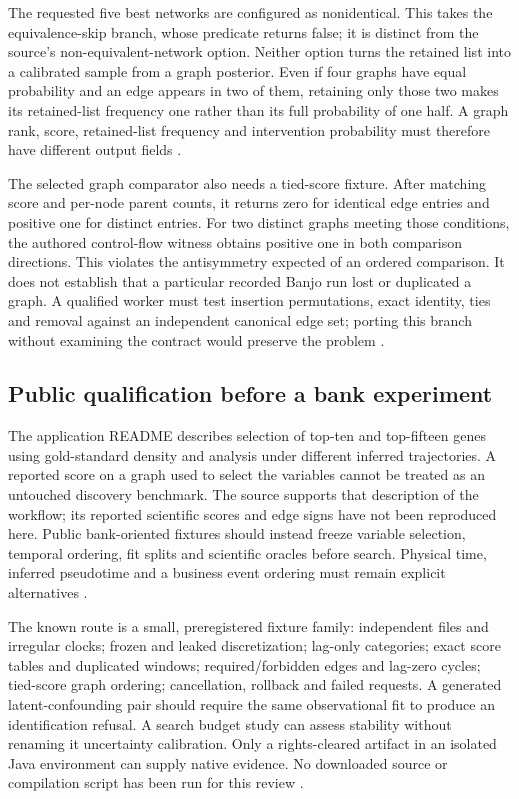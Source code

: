 The requested five best networks are configured as nonidentical. This takes
the equivalence-skip branch, whose predicate returns false; it is distinct
from the source's non-equivalent-network option. Neither option turns the
retained list into a calibrated sample from a graph posterior. Even if four
graphs have equal probability and an edge appears in two of them, retaining
only those two makes its retained-list frequency one rather than its full
probability of one half. A graph rank, score, retained-list frequency and
intervention probability must therefore have different output fields
\cite{exec24_banjo_source,exec24_banjo_choice}.

The selected graph comparator also needs a tied-score fixture. After matching
score and per-node parent counts, it returns zero for identical edge entries
and positive one for distinct entries. For two distinct graphs meeting those
conditions, the authored control-flow witness obtains positive one in both
comparison directions. This violates the antisymmetry expected of an ordered
comparison. It does not establish that a particular recorded Banjo run lost
or duplicated a graph. A qualified worker must test insertion permutations,
exact identity, ties and removal against an independent canonical edge set;
porting this branch without examining the contract would preserve the
problem \cite{exec24_banjo_source,exec24_banjo_choice}.

\subsection{Public qualification before a bank experiment}
The application README describes selection of top-ten and top-fifteen genes
using gold-standard density and analysis under different inferred
trajectories. A reported score on a graph used to select the variables cannot
be treated as an untouched discovery benchmark. The source supports that
description of the workflow; its reported scientific scores and edge signs
have not been reproduced here. Public bank-oriented fixtures should instead
freeze variable selection, temporal ordering, fit splits and scientific
oracles before search. Physical time, inferred pseudotime and a business
event ordering must remain explicit alternatives
\cite{exec24_banjo_source}.

The known route is a small, preregistered fixture family: independent files
and irregular clocks; frozen and leaked discretization; lag-only categories;
exact score tables and duplicated windows; required/forbidden edges and
lag-zero cycles; tied-score graph ordering; cancellation, rollback and failed
requests. A generated latent-confounding pair should require the same
observational fit to produce an identification refusal. A search budget
study can assess stability without renaming it uncertainty calibration.
Only a rights-cleared artifact in an isolated Java environment can supply
native evidence. No downloaded source or compilation script has been run
for this review \cite{exec24_banjo_choice}.

